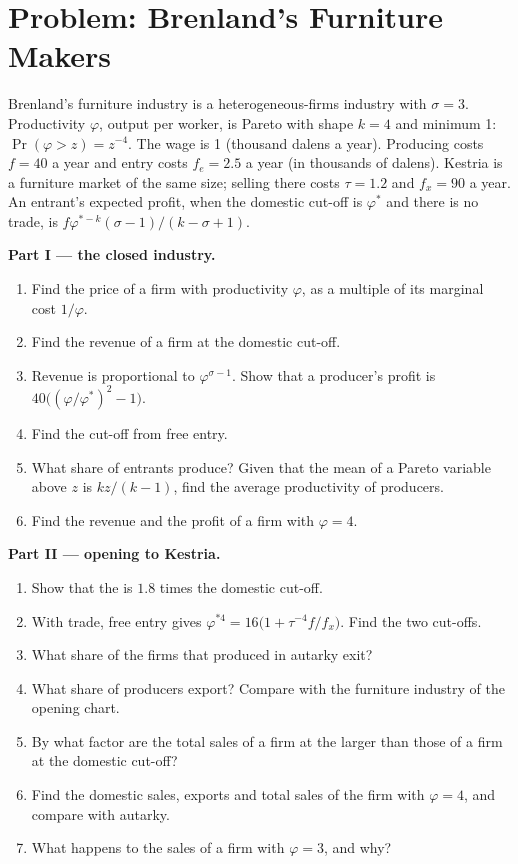 \section{Problem: Brenland's Furniture Makers}\label{sec:b3:scale-variety-firms:problem}

\begin{problem}\label{pb:b3:scale-variety-firms:furniture}
Brenland's furniture industry is a heterogeneous-firms industry with $\sigma = 3$.
Productivity $\varphi$, output per worker, is Pareto with shape $k = 4$ and minimum 1:
$\Pr(\varphi > z) = z^{-4}$. The wage is 1 (thousand dalens a year). Producing costs $f = 40$
a year and entry costs $f_e = 2.5$ a year (in thousands of dalens). Kestria is a
furniture market of the same size; selling there costs $\tau = 1.2$ and $f_x = 90$ a
year. %
An entrant's expected profit, when the domestic cut-off is $\varphi^*$ and there is no
trade, is $f\varphi^{*-k}(\sigma - 1)/(k - \sigma + 1)$.

\medskip\noindent\textbf{Part I --- the closed industry.}
\begin{enumerate}
\item Find the price of a firm with productivity $\varphi$, as a multiple of its
marginal cost $1/\varphi$.
\item Find the revenue of a firm at the domestic cut-off.
\item Revenue is proportional to $\varphi^{\sigma-1}$. Show that a producer's profit is
$40\bigl((\varphi/\varphi^*)^2 - 1\bigr)$.
\item Find the cut-off from free entry.
\item What share of entrants produce? Given that the mean of a Pareto variable
above $z$ is $kz/(k - 1)$, find the average productivity of producers.
\item Find the revenue and the profit of a firm with $\varphi = 4$.
\end{enumerate}

\medskip\noindent\textbf{Part II --- opening to Kestria.}
\begin{enumerate}[resume]
\item Show that the  is $1.8$ times the domestic cut-off.
\item With trade, free entry gives $\varphi^{*4} = 16\bigl(1 + \tau^{-4}f/f_x\bigr)$. Find the
two cut-offs.
\item What share of the firms that produced in autarky exit?
\item What share of producers export? Compare with the furniture industry of the
opening chart.
\item By what factor are the total sales of a firm at the  larger
than those of a firm at the domestic cut-off?
\item Find the domestic sales, exports and total sales of the firm with $\varphi =
4$, and compare with autarky.
\item What happens to the sales of a firm with $\varphi = 3$, and why?
\end{enumerate}


\end{problem}
